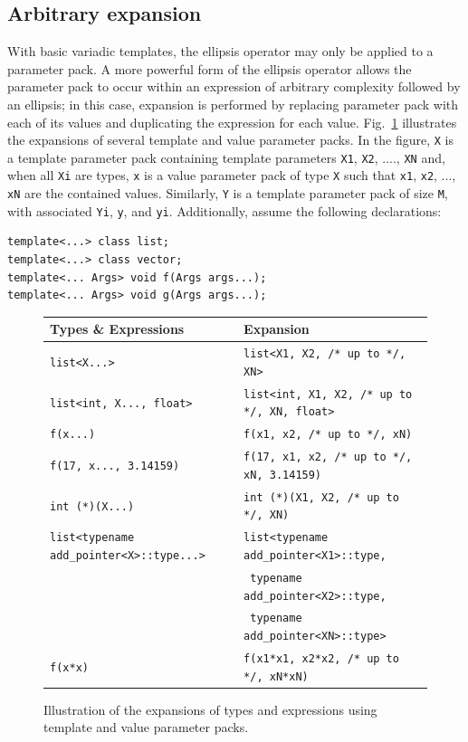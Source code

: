 \documentclass{article}
\begin{document}
\subsection{Arbitrary expansion}
\label{sec:arb-expansion}
With basic variadic templates, the ellipsis operator may only be
applied to a parameter pack. A more powerful form of the ellipsis
operator allows the parameter pack to occur within an expression of
arbitrary complexity followed by an ellipsis; in this case, expansion
is performed by replacing parameter pack with each of its values and
duplicating the expression for each value. Fig.~\ref{fig:expansions}
illustrates the expansions of several template and value parameter
packs. In the figure, \texttt{X} is a template parameter pack
containing template parameters \texttt{X1}, \texttt{X2}, ....,
\texttt{XN} and, when all \texttt{Xi} are types, \texttt{x} is a value
parameter pack of type \texttt{X} such that \texttt{x1}, \texttt{x2},
..., \texttt{xN} are the contained values. Similarly, \texttt{Y} is a
template parameter pack of size \texttt{M}, with associated
\texttt{Yi}, \texttt{y}, and \texttt{yi}. Additionally, assume the
following declarations:
\begin{verbatim}
template<...> class list;
template<...> class vector;
template<... Args> void f(Args args...);
template<... Args> void g(Args args...);
\end{verbatim}

\begin{figure}[h]
\centering
\begin{tabular}{l|l}
\textbf{Types \& Expressions} & \textbf{Expansion} \\\hline
\texttt{list<X...>} & \texttt{list<X1, X2, /* up to */, XN>} \\
\texttt{list<int, X..., float>} & \texttt{list<int, X1, X2, /* up to */, XN,
  float>} \\
\texttt{f(x...)} & \texttt{f(x1, x2, /* up to */, xN)} \\
\texttt{f(17, x..., 3.14159)} & \texttt{f(17, x1, x2, /* up to */, xN,
  3.14159)} \\
\texttt{int (*)(X...)} & \texttt{int (*)(X1, X2, /* up to */, XN)} \\
\texttt{list<typename add\_pointer<X>::type...>} &
\texttt{list<typename add\_pointer<X1>::type,} \\
& \qquad\texttt{{ }typename add\_pointer<X2>::type,} \\
& \qquad\texttt{{ }typename add\_pointer<XN>::type>} \\

\texttt{f(x*x)} & \texttt{f(x1*x1, x2*x2, /* up to */, xN*xN)} \\
\end{tabular}
\caption{Illustration of the expansions of types and
  expressions using template and value parameter packs.}
\label{fig:expansions}
\end{figure}
\end{document}

